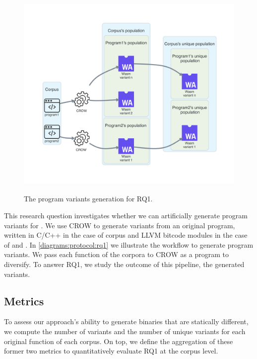 
\section{\rqone}
\label{rq1:method}


\begin{figure}[h]
    \centering
    \includegraphics[height=4.1in]{diagrams/RQ1.pdf}
    \caption{The program variants generation for RQ1.}
    \label{diagrams:protocol:rq1}
\end{figure}


This research question investigates whether we can artificially generate program variants for \wasm. We use CROW to generate variants from an original program, written in C/C++ in the case of \corpusrosetta corpus and LLVM bitcode modules in the case of \corpussodium and \corpusqrcode. 
In \autoref{diagrams:protocol:rq1} we illustrate the workflow to generate \wasm program variants. We pass each function of the corpora to CROW as a program to diversify. To answer RQ1, we study the outcome of this pipeline, the generated \wasm variants. 


\subsection*{Metrics}

To assess our approach's ability to generate \wasm binaries that are statically different, we compute the number of variants and the number of unique variants for each original function of each corpus. 
On top, we define the aggregation of these former two metrics to quantitatively evaluate RQ1 at the corpus level.


